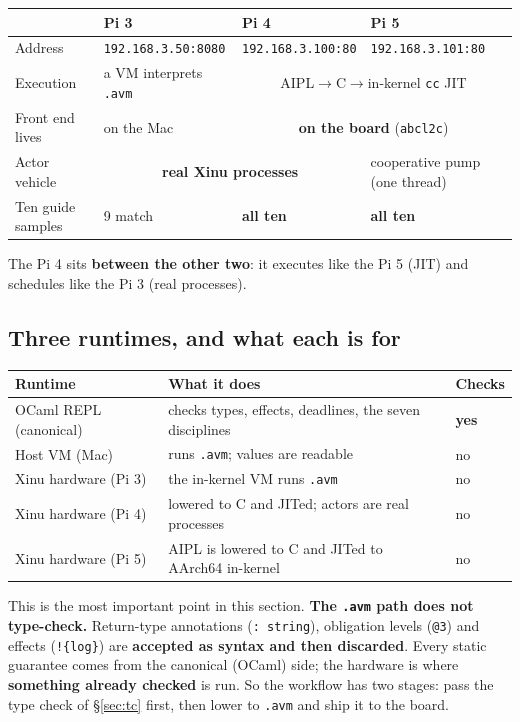 \documentclass[11pt,a4paper]{article}
\begin{document}
\begin{center}
\small
\begin{tabular}{@{}llll@{}}
\toprule
 & Pi 3 & Pi 4 & Pi 5 \\
\midrule
Address & \texttt{192.168.3.50:8080} & \texttt{192.168.3.100:80} & \texttt{192.168.3.101:80} \\
Execution & a VM interprets \texttt{.avm} & \multicolumn{2}{c}{AIPL$\to$C$\to$in-kernel \texttt{cc} JIT} \\
Front end lives & on the Mac & \multicolumn{2}{c}{\textbf{on the board} (\texttt{abcl2c})} \\
Actor vehicle & \multicolumn{2}{c}{\textbf{real Xinu processes}} & cooperative pump (one thread) \\
Ten guide samples & 9 match & \textbf{all ten} & \textbf{all ten} \\
\bottomrule
\end{tabular}
\end{center}

The Pi 4 sits \textbf{between the other two}: it executes like the Pi 5 (JIT)
and schedules like the Pi 3 (real processes).

\subsection{Three runtimes, and what each is for}

\begin{center}
\small
\begin{tabular}{@{}lll@{}}
\toprule
Runtime & What it does & Checks \\
\midrule
OCaml REPL (canonical) & checks types, effects, deadlines, the seven disciplines & \textbf{yes} \\
Host VM (Mac) & runs \texttt{.avm}; values are readable & no \\
Xinu hardware (Pi 3) & the in-kernel VM runs \texttt{.avm} & no \\
Xinu hardware (Pi 4) & lowered to C and JITed; actors are real processes & no \\
Xinu hardware (Pi 5) & AIPL is lowered to C and JITed to AArch64 in-kernel & no \\
\bottomrule
\end{tabular}
\end{center}

This is the most important point in this section. \textbf{The \texttt{.avm} path
does not type-check.} Return-type annotations (\texttt{: string}), obligation
levels (\texttt{@3}) and effects (\texttt{!\{log\}}) are \textbf{accepted as
syntax and then discarded}. Every static guarantee comes from the canonical
(OCaml) side; the hardware is where \textbf{something already checked} is run.
So the workflow has two stages: pass the type check of \S\ref{sec:tc} first,
then lower to \texttt{.avm} and ship it to the board.
\end{document}
